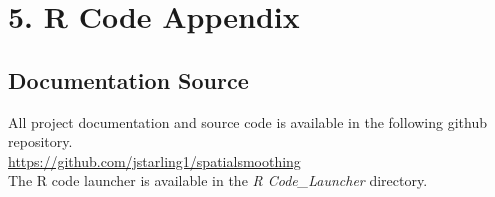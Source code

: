 \documentclass[11pt]{article}
\newcommand{\myindent}{\hspace*{1cm}}
\begin{document}
\newpage
\section{5. R Code Appendix}

\subsection{Documentation Source}
All project documentation and source code is available in the following github repository.\\

\myindent \url{https://github.com/jstarling1/spatialsmoothing}\\

The R code launcher is available in the \textit{R Code\_Launcher} directory.\\
\end{document}
